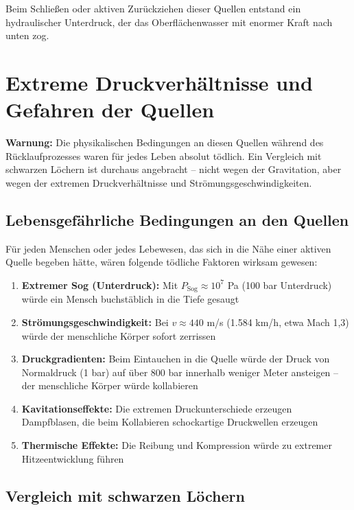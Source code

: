 ﻿\documentclass[12pt,a4paper]{report}
\begin{document}
Beim Schließen oder aktiven Zurückziehen dieser Quellen entstand ein hydraulischer Unterdruck, der das Oberflächenwasser mit enormer Kraft nach unten zog.

\section{Extreme Druckverhältnisse und Gefahren der Quellen}

\textbf{Warnung:} Die physikalischen Bedingungen an diesen Quellen während des Rücklaufpro\-zes\-ses waren für jedes Leben absolut tödlich. Ein Vergleich mit schwarzen Löchern ist durchaus angebracht -- nicht wegen der Gravitation, aber wegen der extremen Druckverhältnisse und Strömungsgeschwindigkeiten.

\subsection{Lebensgefährliche Bedingungen an den Quellen}

Für jeden Menschen oder jedes Lebewesen, das sich in die Nähe einer aktiven Quelle begeben hätte, wären folgende tödliche Faktoren wirksam gewesen:

\begin{enumerate}
	\item \textbf{Extremer Sog (Unterdruck):} Mit $P_{\text{Sog}} \approx 10^7$ Pa (100 bar Unterdruck) würde ein Mensch buchstäblich in die Tiefe gesaugt
	
	\item \textbf{Strömungsgeschwindigkeit:} Bei $v \approx 440$ m/s (1.584 km/h, etwa Mach 1,3) würde der menschliche Körper sofort zerrissen
	
	\item \textbf{Druckgradienten:} Beim Eintauchen in die Quelle würde der Druck von Normaldruck (1 bar) auf über 800 bar innerhalb weniger Meter ansteigen -- der menschliche Körper würde kollabieren
	
	\item \textbf{Kavitationseffekte:} Die extremen Druckunterschiede erzeugen Dampfblasen, die beim Kollabieren schockartige Druckwellen erzeugen
	
	\item \textbf{Thermische Effekte:} Die Reibung und Kompression würde zu extremer Hitzeentwicklung führen
\end{enumerate}

\subsection{Vergleich mit schwarzen Löchern}
\end{document}
